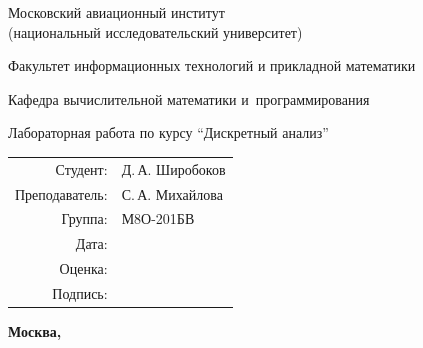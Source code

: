 \begin{titlepage}
\begin{center}
\bfseries

{\Large Московский авиационный институт\\ (национальный исследовательский университет)

}

\vspace{48pt}

{\large Факультет информационных технологий и прикладной математики
}

\vspace{36pt}

{\large Кафедра вычислительной математики и~программирования

}


\vspace{48pt}

Лабораторная работа  по курсу \enquote{Дискретный анализ}

\end{center}

\vspace{72pt}

\begin{flushright}
\begin{tabular}{rl}
Студент: & Д.\,А. Широбоков \\
Преподаватель: & С.\,А. Михайлова \\
Группа: & М8О-201БВ \\
Дата: & \\
Оценка: & \\
Подпись: & \\
\end{tabular}
\end{flushright}

\vfill

\begin{center}
\bfseries
Москва, \the\year
\end{center}
\end{titlepage}

\pagebreak
